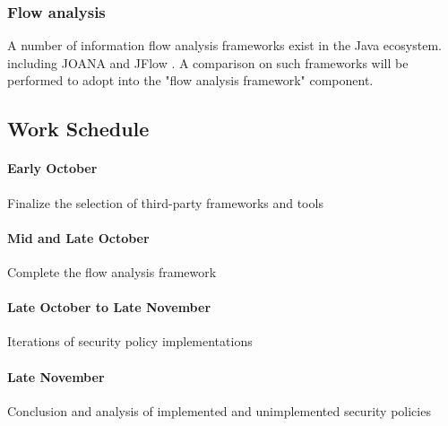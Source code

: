 \documentclass[a4paper, 10pt]{article}
\begin{document}
\subsubsection{Flow analysis}
A number of information flow analysis frameworks exist in the Java ecosystem.
including JOANA \cite{joana} and JFlow \cite{jflow}.
A comparison on such frameworks will be performed
to adopt into the "flow analysis framework" component.

\subsection{Work Schedule}
\paragraph{Early October} Finalize the selection of third-party frameworks and tools
\paragraph{Mid and Late October} Complete the flow analysis framework
\paragraph{Late October to Late November} Iterations of security policy implementations
\paragraph{Late November} Conclusion and analysis
	of implemented and unimplemented security policies


{}
\end{document}

